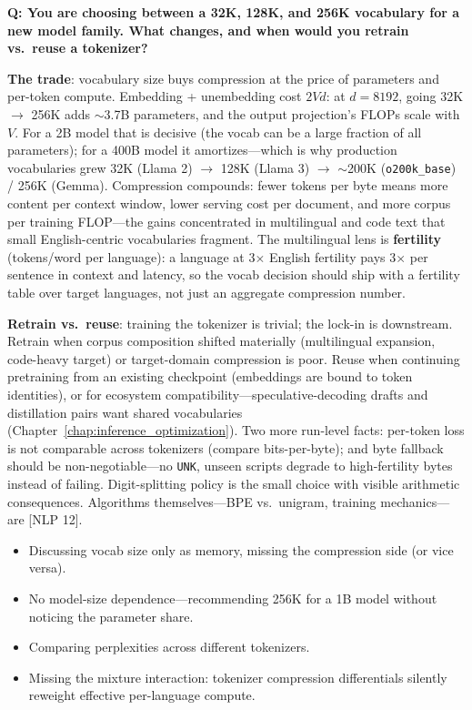 \begin{interviewq}
\textbf{Q: You are choosing between a 32K, 128K, and 256K vocabulary for a new model family. What changes, and when would you retrain vs.\ reuse a tokenizer?}

 \quad {} \quad \badgefreq{\freqmed}

\stronganswer
\textbf{The trade}: vocabulary size buys compression at the price of parameters and per-token compute. Embedding + unembedding cost $2Vd$: at $d = 8192$, going 32K $\rightarrow$ 256K adds $\sim$3.7B parameters, and the output projection's FLOPs scale with $V$. For a 2B model that is decisive (the vocab can be a large fraction of all parameters); for a 400B model it amortizes---which is why production vocabularies grew 32K (Llama 2) $\rightarrow$ 128K (Llama 3) $\rightarrow$ $\sim$200K (\texttt{o200k\_base}) / 256K (Gemma). Compression compounds: fewer tokens per byte means more content per context window, lower serving cost per document, and more corpus per training FLOP---the gains concentrated in multilingual and code text that small English-centric vocabularies fragment. The multilingual lens is \textbf{fertility} (tokens/word per language): a language at 3$\times$ English fertility pays 3$\times$ per sentence in context and latency, so the vocab decision should ship with a fertility table over target languages, not just an aggregate compression number.

\textbf{Retrain vs.\ reuse}: training the tokenizer is trivial; the lock-in is downstream. Retrain when corpus composition shifted materially (multilingual expansion, code-heavy target) or target-domain compression is poor. Reuse when continuing pretraining from an existing checkpoint (embeddings are bound to token identities), or for ecosystem compatibility---speculative-decoding drafts and distillation pairs want shared vocabularies (Chapter~\ref{chap:inference_optimization}). Two more run-level facts: per-token loss is not comparable across tokenizers (compare bits-per-byte); and byte fallback should be non-negotiable---no \texttt{UNK}, unseen scripts degrade to high-fertility bytes instead of failing. Digit-splitting policy is the small choice with visible arithmetic consequences. Algorithms themselves---BPE vs.\ unigram, training mechanics---are [NLP 12].

\redflags
\begin{itemize}
    \item Discussing vocab size only as memory, missing the compression side (or vice versa).
    \item No model-size dependence---recommending 256K for a 1B model without noticing the parameter share.
    \item Comparing perplexities across different tokenizers.
    \item Missing the mixture interaction: tokenizer compression differentials silently reweight effective per-language compute.
\end{itemize}


\end{interviewq}
